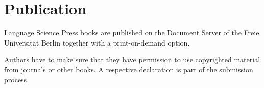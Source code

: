 \chapter{Publication}
\label{chap-publication}
\label{sec-license}

Language Science Press books are published on the Document Server of the Freie Universität Berlin
together with a print-on-demand option.


Authors have to make sure that they have permission to use copyrighted material from journals or
other books. A respective declaration is part of the submission process.



